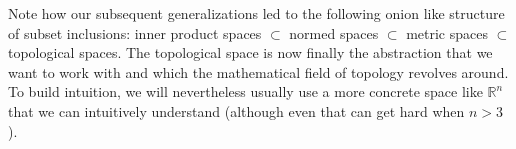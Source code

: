 \medskip
Note how our subsequent generalizations led to the following onion like structure of subset inclusions: inner product spaces $\subset$ normed spaces $\subset$ metric spaces $\subset$ topological spaces. The topological space is now finally the abstraction that we want to work with and which the mathematical field of topology revolves around. To build intuition, we will nevertheless usually use a more concrete space like $\mathbb{R}^n$ that we can intuitively understand (although even that can get hard when $n > 3$).




















